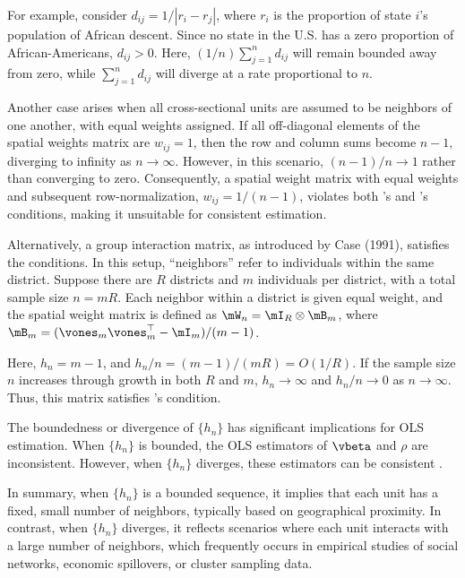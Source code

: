 \documentclass[english,12pt]{book}\usepackage[]{graphicx}\usepackage[]{xcolor}
\begin{document}
For example, consider $d_{ij} = 1 / \left|r_i - r_j\right|$, where $r_i$ is the proportion of state $i$'s population of African descent. Since no state in the U.S. has a zero proportion of African-Americans, $d_{ij}> 0$. Here, $(1/n)\sum_{j = 1}^nd_{ij}$ will remain bounded away from zero, while $\sum_{j = 1}^nd_{ij}$ will diverge at a rate proportional to $n$.

Another case arises when all cross-sectional units are assumed to be neighbors of one another, with equal weights assigned. If all off-diagonal elements of the spatial weights matrix are $w_{ij} = 1$, then the row and column sums become $n - 1$, diverging to infinity as $n \to \infty$. However, in this scenario, $(n - 1)/n \to 1$ rather than converging to zero. Consequently, a spatial weight matrix with equal weights and subsequent row-normalization, $w_{ij} = 1/(n - 1)$, violates both \cite{lee2004asymptotic}'s and \cite{kelejian1998generalized, kelejian1999generalized}'s conditions, making it unsuitable for consistent estimation.  

Alternatively, a group interaction matrix, as introduced by Case (1991), satisfies the conditions. In this setup, ``neighbors'' refer to individuals within the same district. Suppose there are $R$ districts and $m$ individuals per district, with a total sample size $n = mR$. Each neighbor within a district is given equal weight, and the spatial weight matrix is defined as $\mW_n = \mI_R \otimes \mB_m$, where $\mB_m = (\vones_m \vones_m^\top - \mI_m)/(m - 1)$.  

Here, $h_n = m - 1$, and $h_n/n = (m - 1)/(mR) = O(1/R)$. If the sample size $n$ increases through growth in both $R$ and $m$, $h_n \to \infty$ and $h_n/n \to 0$ as $n \to \infty$. Thus, this matrix satisfies \cite{lee2004asymptotic}'s condition.  

\begin{remark}
  The boundedness or divergence of $\{h_n\}$ has significant implications for OLS estimation. When $\{h_n\}$ is bounded, the OLS estimators of $\vbeta$ and $\rho$ are inconsistent. However, when $\{h_n\}$ diverges, these estimators can be consistent \citep[see][]{lee2002consistency}. 
\end{remark}

In summary, when $\{h_n\}$ is a bounded sequence, it implies that each unit has a fixed, small number of neighbors, typically based on geographical proximity. In contrast, when $\{h_n\}$ diverges, it reflects scenarios where each unit interacts with a large number of neighbors, which frequently occurs in empirical studies of social networks, economic spillovers, or cluster sampling data.
\end{document}
